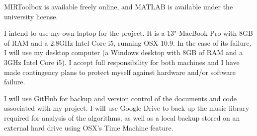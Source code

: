 \documentclass[12pt]{article}
\begin{document}
 MIRToolbox is available freely online, and MATLAB is available under the university license.

I intend to use my own laptop for the project. It is a 13" MacBook Pro with 8GB of RAM and a 2.8GHz Intel Core i5, running OSX 10.9. In the case of its failure, I will use my desktop computer (a Windows desktop with 8GB of RAM and a 3GHz Intel Core i5). I accept full responsibility for both machines and I have made contingency plans to protect myself against hardware and/or software failure.

I will use GitHub for backup and version control of the documents and code associated with my project. I will use Google Drive to back up the music library required for analysis of the algorithms, as well as a local backup stored on an external hard drive using OSX's Time Machine feature.
\end{document}
